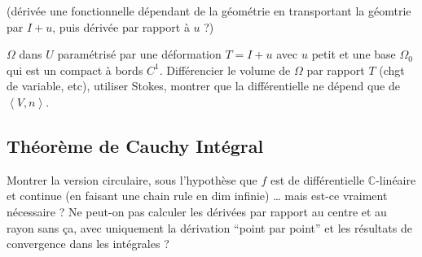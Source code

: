 \documentclass[french,]{article}
\begin{document}
(dérivée une fonctionnelle dépendant de la géométrie en transportant la
géomtrie par \(I+u\), puis dérivée par rapport à \(u\) ?)

\(\Omega\) dans \(U\) paramétrisé par une déformation \(T = I + u\) avec
\(u\) petit et une base \(\Omega_0\) qui est un compact à bords \(C^1\).
Différencier le volume de \(\Omega\) par rapport \(T\) (chgt de
variable, etc), utiliser Stokes, montrer que la différentielle ne dépend
que de \(\left<V, n\right>\).

\hypertarget{thuxe9oruxe8me-de-cauchy-intuxe9gral}{%
\subsection{Théorème de Cauchy
Intégral}\label{thuxe9oruxe8me-de-cauchy-intuxe9gral}}

Montrer la version circulaire, sous l'hypothèse que \(f\) est de
différentielle \(\mathbb{C}\)-linéaire et continue (en faisant une chain
rule en dim infinie) \ldots{} mais est-ce vraiment nécessaire ? Ne
peut-on pas calculer les dérivées par rapport au centre et au rayon sans
ça, avec uniquement la dérivation ``point par point'' et les résultats
de convergence dans les intégrales ?
\end{document}
